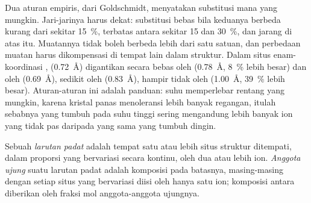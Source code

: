 Dua aturan empiris, dari Goldschmidt, menyatakan substitusi mana yang mungkin. Jari-jarinya harus dekat: substitusi bebas bila keduanya berbeda kurang dari sekitar \qty{15}{\percent}, terbatas antara sekitar 15 dan \qty{30}{\percent}, dan jarang di atas itu. Muatannya tidak boleh berbeda lebih dari satu satuan, dan perbedaan muatan harus dikompensasi di tempat lain dalam struktur. Dalam situs enam-koordinasi ,  (\qty{0.72}{\angstrom}) digantikan secara bebas oleh  (\qty{0.78}{\angstrom}, \qty{8}{\percent} lebih besar) dan oleh  (\qty{0.69}{\angstrom}), sedikit oleh  (\qty{0.83}{\angstrom}), hampir tidak oleh  (\qty{1.00}{\angstrom}, \qty{39}{\percent} lebih besar).
Aturan-aturan ini adalah panduan: suhu memperlebar rentang yang mungkin, karena kristal panas menoleransi lebih banyak regangan, itulah sebabnya  yang tumbuh pada suhu tinggi sering mengandung lebih banyak ion yang tidak pas daripada  yang sama yang tumbuh dingin.

\begin{definition}\label{def:b1:rock-forming-minerals:solid-solution}
Sebuah \emph{larutan padat} adalah  tempat satu atau lebih situs struktur ditempati, dalam proporsi yang bervariasi secara kontinu, oleh dua atau lebih ion. \emph{Anggota ujung} suatu larutan padat adalah komposisi pada batasnya, masing-masing dengan setiap situs yang bervariasi diisi oleh hanya satu ion; komposisi antara diberikan oleh fraksi mol anggota-anggota ujungnya.
\end{definition}

